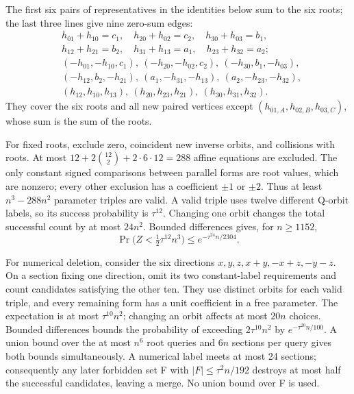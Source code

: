 \documentclass[11pt,a4paper]{article}
\begin{document}
The first six pairs of representatives in the identities below sum to the six roots; the last three lines give nine zero-sum edges: \begin{equation}
\begin{aligned}
&h_{01}+h_{10}=c_1,\quad h_{20}+h_{02}=c_2,\quad
 h_{30}+h_{03}=b_1,\\
&h_{12}+h_{21}=b_2,\quad h_{31}+h_{13}=a_1,\quad
 h_{23}+h_{32}=a_2;\\
&(-h_{01},-h_{10},c_1),\ (-h_{20},-h_{02},c_2),\
 (-h_{30},b_1,-h_{03}),\\
&(-h_{12},b_2,-h_{21}),\ (a_1,-h_{31},-h_{13}),\
 (a_2,-h_{23},-h_{32}),\\
&(h_{12},h_{10},h_{13}),\ (h_{20},h_{23},h_{21}),\
 (h_{30},h_{31},h_{32}).
\end{aligned}
\tag{PC4}\label{eq:PC4}
\end{equation} They cover the six roots and all new paired vertices except \((h_{01,A},h_{02,B},h_{03,C})\), whose sum is the sum of the roots.

For fixed roots, exclude zero, coincident new inverse orbits, and collisions with roots. At most \(12+2\binom{12}{2}+2\cdot6\cdot12=288\) affine equations are excluded. The only constant signed comparisons between parallel forms are root values, which are nonzero; every other exclusion has a coefficient \(\pm1\) or \(\pm2\). Thus at least \(n^3-288n^2\) parameter triples are valid. A valid triple uses twelve different Q-orbit labels, so its success probability is \(\tau^{12}\). Changing one orbit changes the total successful count by at most \(24n^2\). Bounded differences gives, for \(n\ge1152\), \begin{equation}
\Pr\bigl(Z<\tfrac12\tau^{12}n^3\bigr)
 \le e^{-\tau^{24}n/2304}.
\tag{PC4a}\label{eq:PC4a}
\end{equation}

For numerical deletion, consider the six directions \(x,y,z,x+y,-x+z,-y-z\). On a section fixing one direction, omit its two constant-label requirements and count candidates satisfying the other ten. They use distinct orbits for each valid triple, and every remaining form has a unit coefficient in a free parameter. The expectation is at most \(\tau^{10}n^2\); changing an orbit affects at most \(20n\) choices. Bounded differences bounds the probability of exceeding \(2\tau^{10}n^2\) by \(e^{-\tau^{20}n/100}\). A union bound over the at most \(n^6\) root queries and \(6n\) sections per query gives both bounds simultaneously. A numerical label meets at most 24 sections; consequently any later forbidden set F with \(|F|\le\tau^2n/192\) destroys at most half the successful candidates, leaving a merge. No union bound over F is used.
\end{document}
